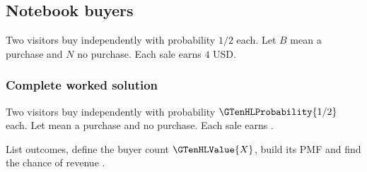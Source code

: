 
\subsection{Notebook buyers}
\label{subsec:t2-c1-notebook-buyers}
Two visitors buy independently with probability $1/2$ each. Let $B$ mean a purchase and $N$ no purchase. Each sale earns $4$ USD.

\subsubsection*{Complete worked solution}
\label{subsubsec:t2-c1-notebook-buyers-solution}
Two visitors buy independently with probability $\GTenHLProbability{1/2}$ each. Let  mean a purchase and  no purchase. Each sale earns .

List outcomes, define the buyer count $\GTenHLValue{X}$, build its PMF and find the chance of revenue .

